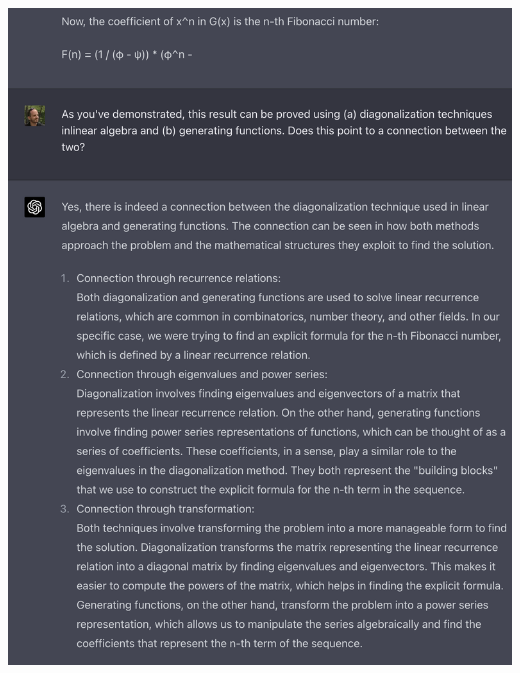 \begin{mdframed}
\includegraphics[width=400pt]{img/linear-algebra--vector-spaces-and-fields--computing-the-n-th-fibonacci-number-generating-function-63d4.png}
\end{mdframed}

